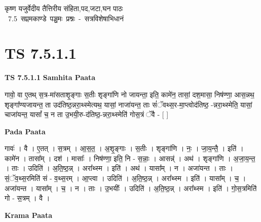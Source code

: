 \documentclass[17pt]{extarticle}
\begin{document}
\begin{titlepage}
    \begin{center}
 
\begin{sanskrit}
    { \Large
    कृष्ण यजुर्वेदीय तैत्तिरीय संहिता,पद,जटा,घन पाठः 
    }
    \\
    \vspace{2.5cm}
    \mbox{ \Large
    7.5      सप्तमकाण्डे पञ्चमः प्रश्नः - सत्रविशेषाभिधानं   }
\end{sanskrit}
\end{center}

\end{titlepage}
\tableofcontents
{}
\pagebreak


\section{ TS 7.5.1.1 }

\textbf{TS 7.5.1.1 } \newline
\textbf{Samhita Paata} \newline

गावो॒ वा ए॒तथ् स॒त्र-मा॑सताशृ॒ङ्गाः स॒तीः शृङ्गा॑णि नो जायन्ता॒ इति॒ कामे॑न॒ तासां॒ दश॒मासा॒ निष॑ण्णा॒ आस॒न्नथ॒ शृङ्गा᳚ण्यजायन्त॒ ता उद॑तिष्ठ॒न्नरा॒थ्स्मेत्यथ॒ यासां॒ नाजा॑यन्त॒ ताः सं॑ॅवथ्स॒र-मा॒प्त्वोद॑तिष्ठ॒ -न्नरा॒थ्स्मेति॒ यासां॒ चाजा॑यन्त॒ यासां᳚ च॒ न ता उ॒भयी॒रु-द॑तिष्ठ॒-न्नरा॒थ्स्मेति॑ गोस॒त्रं ॅवै - [  ] \newline

\textbf{Pada Paata} \newline

गावः॑ । वै । ए॒तत् । स॒त्रम् । आ॒स॒त॒ । अ॒शृ॒ङ्गाः । स॒तीः । शृङ्गा॑णि । नः॒ । जा॒य॒न्तै॒ । इति॑ । कामे॑न । तासा᳚म् । दश॑ । मासाः᳚ । निष॑ण्णा॒ इति॒ नि - स॒न्नाः॒ । आसन्न्॑ । अथ॑ । शृङ्गा॑णि । अ॒जा॒य॒न्त॒ । ताः । उदिति॑ । अ॒ति॒ष्ठ॒न्न् । अरा᳚थ्स्म । इति॑ । अथ॑ । यासा᳚म् । न । अजा॑यन्त । ताः । सं॒ॅव॒थ्स॒रमिति॑ सं -  व॒थ्स॒रम् । आ॒प्त्वा । उदिति॑ । अ॒ति॒ष्ठ॒न्न् । अरा᳚थ्स्म । इति॑ । यासा᳚म् । च॒ । अजा॑यन्त । यासा᳚म् । च॒ । न । ताः । उ॒भयीः᳚ । उदिति॑ । अ॒ति॒ष्ठ॒न्न् । अरा᳚थ्स्म । इति॑ । गो॒स॒त्रमिति॑ गो - स॒त्रम् । वै ।  \newline


\textbf{Krama Paata} \newline
\end{document}
